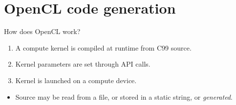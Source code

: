 \documentclass[@BEAMER_OPTIONS@]{beamer}
\begin{document}
\note{ }

\section{OpenCL code generation}

\begin{frame}{}
    \tableofcontents[currentsection]
\end{frame}

\note{ }

\begin{frame}{How does OpenCL work?}
    \begin{enumerate}
        \item A compute kernel is compiled at runtime from C99 source.
        \item Kernel parameters are set through API calls.
        \item Kernel is launched on a compute device.
    \end{enumerate}
    \vspace{\baselineskip}
    \pause
    \begin{itemize}
        \item Source may be read from a file, or stored in a static
            string, or \alert{\emph{generated}}.
    \end{itemize}
\end{frame}

\note{ }
\end{document}
